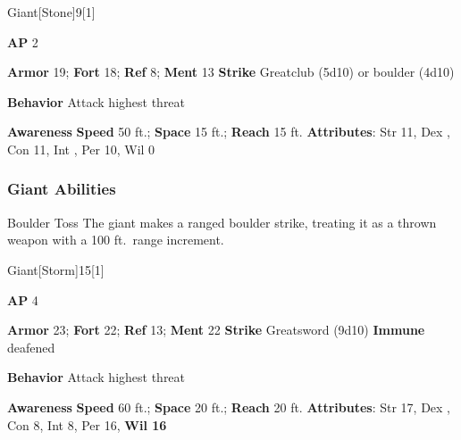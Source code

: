 \begin{monsection}{Giant}[Stone]{9}[1]
\vspace{-1em}\vspace{-1em}
\begin{spellcontent}
\begin{spelltargetinginfo}
{\textbf{AP} 2}

\pari \textbf{Armor} 19;
\textbf{Fort} 18;
\textbf{Ref} 8;
\textbf{Ment} 13
\pari \textbf{Strike} Greatclub  (5d10) or boulder  (4d10)



\pari \textbf{Behavior} Attack highest threat
\end{spelltargetinginfo}
\end{spellcontent}

\begin{monsterfooter}
\pari \textbf{Awareness} 
\pari \textbf{Speed} 50 ft.;
\textbf{Space} 15 ft.;
\textbf{Reach} 15 ft.
\pari \textbf{Attributes}:
Str 11,
Dex ,
Con 11,
Int ,
Per 10,
Wil 0
\end{monsterfooter}
\end{monsection}


\subsubsection{Giant Abilities}

\begin{ability}{Boulder Toss}
The giant makes a ranged boulder strike, treating it as a thrown weapon with a 100 ft.\ range increment.
\end{ability}

\begin{monsection}{Giant}[Storm]{15}[1]
\vspace{-1em}\vspace{-1em}
\begin{spellcontent}
\begin{spelltargetinginfo}
{\textbf{AP} 4}

\pari \textbf{Armor} 23;
\textbf{Fort} 22;
\textbf{Ref} 13;
\textbf{Ment} 22
\pari \textbf{Strike} Greatsword  (9d10)
\pari \textbf{Immune} deafened


\pari \textbf{Behavior} Attack highest threat
\end{spelltargetinginfo}
\end{spellcontent}

\begin{monsterfooter}
\pari \textbf{Awareness} 
\pari \textbf{Speed} 60 ft.;
\textbf{Space} 20 ft.;
\textbf{Reach} 20 ft.
\pari \textbf{Attributes}:
Str 17,
Dex ,
Con 8,
Int 8,
Per 16,
\textbf{Wil 16}
\end{monsterfooter}
\end{monsection}


